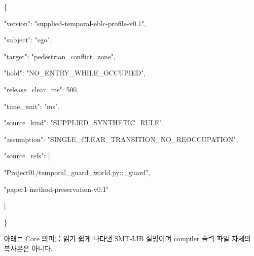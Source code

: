 \documentclass[11pt,a4paper]{article}
\begin{document}
\begingroup\small\ttfamily\setlength{\parskip}{1pt}
\noindent\hspace*{0.0em}\{\par
\noindent\hspace*{1.0em}"version": "supplied-temporal-eblc-profile-v0.1",\par
\noindent\hspace*{1.0em}"subject": "ego",\par
\noindent\hspace*{1.0em}"target": "pedestrian\_\allowbreak{}conflict\_\allowbreak{}zone",\par
\noindent\hspace*{1.0em}"hold": "NO\_\allowbreak{}ENTRY\_\allowbreak{}WHILE\_\allowbreak{}OCCUPIED",\par
\noindent\hspace*{1.0em}"release\_\allowbreak{}clear\_\allowbreak{}ms": 500,\par
\noindent\hspace*{1.0em}"time\_\allowbreak{}unit": "ms",\par
\noindent\hspace*{1.0em}"source\_\allowbreak{}kind": "SUPPLIED\_\allowbreak{}SYNTHETIC\_\allowbreak{}RULE",\par
\noindent\hspace*{1.0em}"assumption": "SINGLE\_\allowbreak{}CLEAR\_\allowbreak{}TRANSITION\_\allowbreak{}NO\_\allowbreak{}REOCCUPATION",\par
\noindent\hspace*{1.0em}"source\_\allowbreak{}refs": [\par
\noindent\hspace*{2.0em}"Project01/temporal\_\allowbreak{}guard\_\allowbreak{}world.py::\_\allowbreak{}guard",\par
\noindent\hspace*{2.0em}"paper1-method-preservation-v0.1"\par
\noindent\hspace*{1.0em}]\par
\noindent\hspace*{0.0em}\}\par\endgroup\par

아래는 Core 의미를 읽기 쉽게 나타낸 SMT-LIB 설명이며 compiler 출력 파일 자체의 복사본은 아니다.\par
\end{document}

